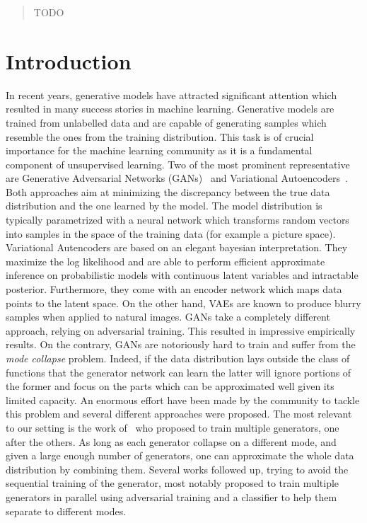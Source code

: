 \documentclass{article}
\begin{document}
\printAffiliationsAndNotice{\icmlEqualContribution} %

\begin{abstract}
TODO
\end{abstract}

\section{Introduction}
In recent years, generative models have attracted significant attention which resulted in many success stories in machine learning. Generative models are trained from unlabelled data and are capable of generating samples which resemble the ones from the training distribution. This task is of crucial importance for the machine learning community as it is a fundamental component of unsupervised learning.
Two of the most prominent representative are Generative Adversarial Networks (GANs)~\cite{goodfellow2014generative} and Variational Autoencoders~\cite{kingma2013auto}. Both approaches aim at minimizing the discrepancy between the true data distribution and the one learned by the model. The model distribution is typically parametrized with a neural network which transforms random vectors into samples in the space of the training data (for example a picture space). Variational Autencoders are based on an elegant bayesian interpretation. They maximize the log likelihood and are able to perform efficient approximate inference on probabilistic models with continuous latent variables and intractable posterior. Furthermore, they come with an encoder network which maps data points to the latent space. On the other hand, VAEs are known to produce blurry samples when applied to natural images. GANs take a completely different approach, relying on adversarial training. This resulted in impressive empirically results. On the contrary, GANs are notoriously hard to train and suffer from the \textit{mode collapse} problem. Indeed, if the data distribution lays outside the class of functions that the generator network can learn the latter will ignore portions of the former and focus on the parts which can be approximated well given its limited capacity. An enormous effort have been made by the community to tackle this problem and several different approaches were proposed. The most relevant to our setting is the work of~\cite{Tolstikhin:2017wo} who proposed to train multiple generators, one after the others. As long as each generator collapse on a different mode, and given a large enough number of generators, one can approximate the whole data distribution by combining them. Several works followed up, trying to avoid the sequential training of the generator, most notably \cite{hoang2017multi} proposed to train multiple generators in parallel using adversarial training and a classifier to help them separate to different modes.
\end{document}
